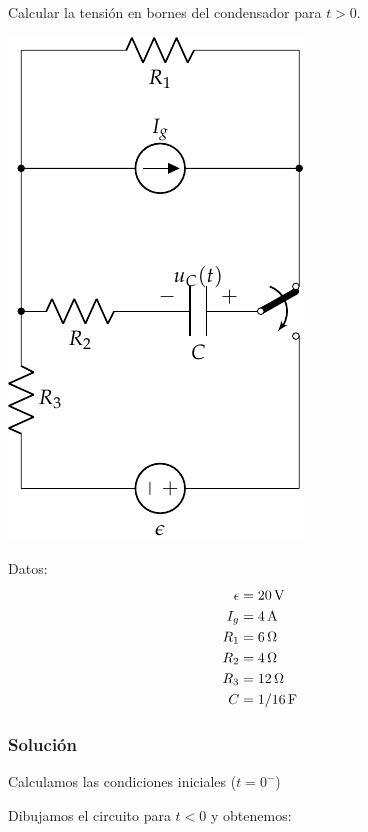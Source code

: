\documentclass[12pt]{article}
\begin{document}
Calcular la tensión en bornes del condensador para $t > 0$.

\begin{minipage}{0.5\textwidth}
  \includegraphics[scale=0.85]{figs/FM_4_3}
\end{minipage}
\hfill
\begin{minipage}{0.5\textwidth}
  Datos:
  \begin{align*}
    \epsilon &= \SI{20}{\volt}\\
    I_g &= \SI{4}{\ampere}\\
    R_1 &= \SI{6}{\ohm}\\
    R_2 &= \SI{4}{\ohm}\\
    R_3 &= \SI{12}{\ohm}\\
    C &= \SI[parse-numbers=false]{1/16}{\farad}      
  \end{align*}

\end{minipage}

\subsubsection*{Solución}

Calculamos las condiciones iniciales ($t = 0^-$)

Dibujamos el circuito para $t < 0$ y obtenemos:
\end{document}
